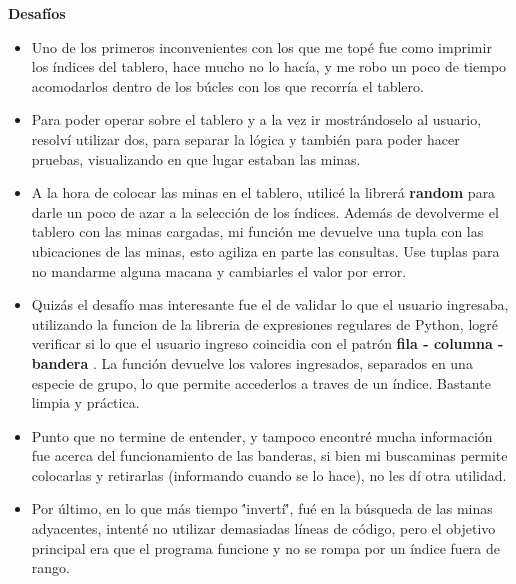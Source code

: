 \documentclass{article}
\begin{document}
\begin{description}
	\item \textbf{Desaf\'ios}\\
		
		\begin{itemize}
			\item Uno de los primeros inconvenientes con los que me top\'e fue como imprimir los \'indices del tablero, hace mucho no lo hac\'ia, y me robo un poco de tiempo acomodarlos dentro de los b\'ucles con los que recorr\'ia el tablero.
			\item Para poder operar sobre el tablero y a la vez ir mostr\'andoselo al usuario, resolv\'i utilizar dos, para separar la l\'ogica y tambi\'en para poder hacer pruebas, visualizando en que lugar estaban las minas.
			\item A la hora de colocar las minas en el tablero, utilic\'e la librer\'a \textbf{random} para darle un poco de azar a la selecci\'on de los \'indices. Adem\'as de devolverme el tablero con las minas cargadas, mi funci\'on me devuelve una tupla con las ubicaciones de las minas, esto agiliza en parte las consultas. Use tuplas para no mandarme alguna macana y cambiarles el valor por error.
			\item Quiz\'as el desaf\'io mas interesante fue el de validar lo que el usuario ingresaba, utilizando la funcion  de la libreria de expresiones regulares de Python, logr\'e verificar si lo que el usuario ingreso coincidia con el patr\'on \textbf{fila - columna - bandera} . La funci\'on  devuelve los valores ingresados, separados en una especie de grupo, lo que permite accederlos a traves de un \'indice. Bastante limpia y pr\'actica.
			\item Punto que no termine de entender, y tampoco encontr\'e mucha informaci\'on fue acerca del funcionamiento de las banderas, si bien mi buscaminas permite colocarlas y retirarlas (informando cuando se lo hace), no les d\'i otra utilidad.
			\item Por \'ultimo, en lo que m\'as tiempo \''invert\'i\'', fu\'e en la b\'usqueda de las minas adyacentes, intent\'e no utilizar demasiadas l\'ineas de c\'odigo, pero el objetivo principal era que el programa funcione y no se rompa por un \'indice fuera de rango.
		\end{itemize}

\end{description}

\newpage
\end{document}
